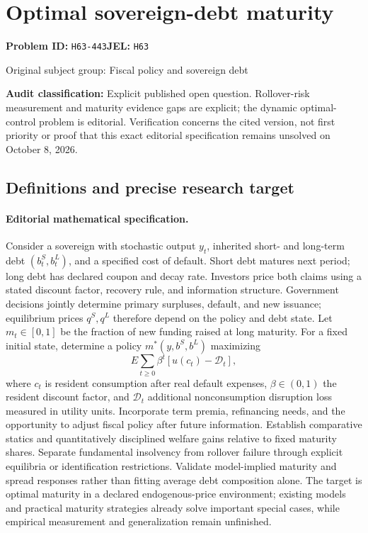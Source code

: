 \documentclass[11pt,a4paper]{article}
\begin{document}
\section*{Optimal sovereign-debt maturity}
\textbf{Problem ID:} \texttt{H63-443}\quad \textbf{JEL:} \texttt{H63}\par
\label{problem:OP-0257}
{\sffamily\small\color{muted}Original subject group: Fiscal policy and sovereign debt\par}
\label{definitions:problem:30007538}
\textbf{Audit classification:} Explicit published open question. Rollover-risk measurement and maturity evidence gaps are explicit; the dynamic optimal-control problem is editorial. Verification concerns the cited version, not first priority or proof that this exact editorial specification remains unsolved on October 8, 2026.
\subsection*{Definitions and precise research target}
\paragraph{Editorial mathematical specification.} Consider a sovereign with stochastic output \(y_t\), inherited short- and long-term debt \((b_t^S,b_t^L)\), and a specified cost of default. Short debt matures next period; long debt has declared coupon and decay rate. Investors price both claims using a stated discount factor, recovery rule, and information structure. Government decisions jointly determine primary surpluses, default, and new issuance; equilibrium prices \(q^S,q^L\) therefore depend on the policy and debt state.
Let \(m_t\in[0,1]\) be the fraction of new funding raised at long maturity. For a fixed initial state, determine a policy \(m^*(y,b^S,b^L)\) maximizing
\[
E\sum_{t\ge0}\beta^t
[u(c_t)-\mathcal D_t],
\]
where \(c_t\) is resident consumption after real default expenses, \(\beta\in(0,1)\) the resident discount factor, and \(\mathcal D_t\) additional nonconsumption disruption loss measured in utility units. Incorporate term premia, refinancing needs, and the opportunity to adjust fiscal policy after future information. Establish comparative statics and quantitatively disciplined welfare gains relative to fixed maturity shares. Separate fundamental insolvency from rollover failure through explicit equilibria or identification restrictions. Validate model-implied maturity and spread responses rather than fitting average debt composition alone. The target is optimal maturity in a declared endogenous-price environment; existing models and practical maturity strategies already solve important special cases, while empirical measurement and generalization remain unfinished.
\end{document}
